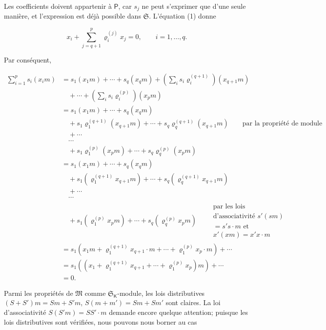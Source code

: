 Les coefficients doivent appartenir à \(\mathsf P\), car \(s_j\) ne peut s'exprimer que d'une seule manière, et l'expression est déjà possible dans \(\mathfrak S\). L'équation (1) donne

\[
x_i+\sum_{j=q+1}^{p}\varrho_i^{(j)}x_j=0,
\qquad i=1,\ldots,q.
\]

Par conséquent,

\[
\begin{aligned}
\sum_{i=1}^{p}s_i(x_i m)
&=s_1(x_1m)+\cdots+s_q(x_qm)
  +\left(\sum_i s_i\varrho_i^{(q+1)}\right)(x_{q+1}m)\\
&\quad+\cdots+\left(\sum_i s_i\varrho_i^{(p)}\right)(x_pm)\\
&=s_1(x_1m)+\cdots+s_q(x_qm)\\
&\quad+s_1\varrho_1^{(q+1)}(x_{q+1}m)+\cdots+s_q\varrho_q^{(q+1)}(x_{q+1}m)
  \qquad\text{par la propriété de module}\\
&\quad+\cdots\\
&\quad\cdots\\
&\quad+s_1\varrho_1^{(p)}(x_pm)+\cdots+s_q\varrho_q^{(p)}(x_pm)\\
&=s_1(x_1m)+\cdots+s_q(x_qm)\\
&\quad+s_1(\varrho_1^{(q+1)}x_{q+1}m)+\cdots+s_q(\varrho_q^{(q+1)}x_{q+1}m)\\
&\quad+\cdots\\
&\quad\cdots\\
&\quad+s_1(\varrho_1^{(p)}x_pm)+\cdots+s_q(\varrho_q^{(p)}x_pm)
  \qquad\begin{gathered}\text{par les lois}\\ \text{d'associativité }s'(sm)\\ =s's\cdot m\text{ et}\\ x'(xm)=x'x\cdot m\end{gathered}\\
&=s_1\left(x_1m+\varrho_1^{(q+1)}x_{q+1}\cdot m+\cdots+\varrho_1^{(p)}x_p\cdot m\right)+\cdots\\
&=s_1\left(\left(x_1+\varrho_1^{(q+1)}x_{q+1}+\cdots+\varrho_1^{(p)}x_p\right)m\right)+\cdots\\
&=0.
\end{aligned}
\]

Parmi les propriétés de \(\mathfrak M\) comme \(\mathfrak S_{\mathsf K}\)-module, les lois distributives \((S+S')m=Sm+S'm\), \(S(m+m')=Sm+Sm'\) sont claires. La loi d'associativité \(S(S'm)=SS'\cdot m\) demande encore quelque attention; puisque les lois distributives sont vérifiées, nous pouvons nous borner au cas

